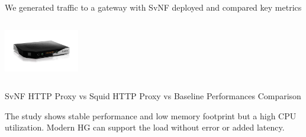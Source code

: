 \documentclass[a4paper]{beamer}
\begin{document}
\begin{frame}{We generated traffic to a gateway with SvNF deployed and compared key metrics}
\begin{columns}[t]
				\begin{column}[T]{0.90 \textwidth}
				\centering
				\includegraphics[height=5em]{livebox.png}					
				\end{column}
				
			\end{columns}

	
\vspace{0.5em}
\small{		SvNF HTTP Proxy vs Squid HTTP Proxy vs Baseline Performances Comparison}
\vspace{2.5em}
	\begin{block}{}
		The study shows stable performance and low memory footprint but a high CPU utilization. Modern HG can support the load without error or added latency.
	\end{block}
	
								
\end{frame}
\end{document}
